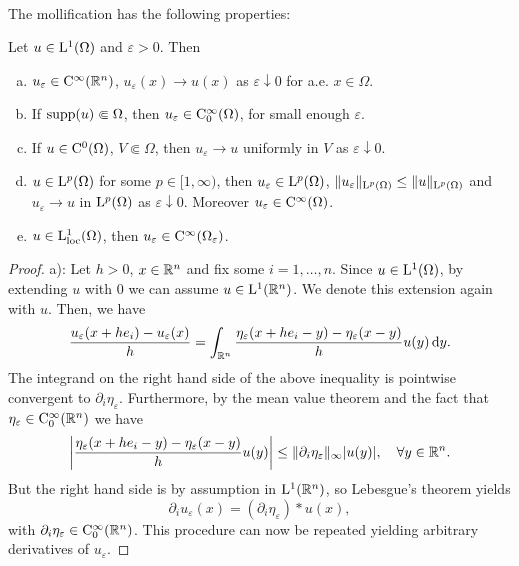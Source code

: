 \begin{enumerate}[i)]
\begin{align*}
  \end{align*}
  The mollification has the following properties:
  \begin{thm}
    Let $u \in \mathrm{L}^1(\Omega)$ and $\varepsilon > 0$. Then
    \begin{enumerate}[a)]
      \item $u_\varepsilon \in \mathrm{C}^\infty(\mathbb{R}^n)$, $u_\varepsilon(x) \to u(x)$ as $\varepsilon \downarrow 0$ for a.e. $x \in \Omega$.
      \item If $\operatorname{supp}(u) \Subset \Omega$, then $u_\varepsilon \in \mathrm{C}_0^\infty(\Omega)$, for small enough $\varepsilon$. 
      \item If $u \in \mathrm{C}^0(\Omega)$, $V \Subset \Omega$, then $u_\varepsilon \to u$ uniformly in $V$ as $\varepsilon \downarrow 0$.
      \item $u \in \mathrm{L}^p(\Omega)$ for some $p \in [1,\infty)$, then $u_\varepsilon \in \mathrm{L}^p(\Omega)$, $\|u_\varepsilon\|_{\mathrm{L}^p(\Omega)} \leq \|u\|_{\mathrm{L}^p(\Omega)}$ and $u_\varepsilon \to u$ in $\mathrm{L}^p(\Omega)$ as $\varepsilon \downarrow 0$.
          Moreover $u_\varepsilon \in \mathrm{C}^\infty(\Omega)$.
        \item $u \in \mathrm{L}_{\operatorname{loc}}^1(\Omega)$, then $u_\varepsilon \in \mathrm{C}^\infty(\Omega_\varepsilon)$.
    \end{enumerate}
  \end{thm}
  \begin{proof}
    a): Let $h > 0$, $x \in \mathbb{R}^n$ and fix some $i = 1,\dots,n$. Since $u \in \mathrm{L}^1(\Omega)$, by extending $u$ with $0$ we can assume $u \in \mathrm{L}^1(\mathbb{R}^n)$. 
    We denote this extension again with $u$.
    Then, we have
    $$
    \frac{u_\varepsilon(x + h e_i) - u_\varepsilon(x)}{h}
    = \int_{\mathbb{R}^n} \frac{\eta_\varepsilon(x + h e_i - y) - \eta_\varepsilon(x - y)}{h} u(y) \, {\operatorname{d}\!{y}} .
    $$
    The integrand on the right hand side of the above inequality is pointwise convergent to $\partial_i \eta_\varepsilon$.
    Furthermore, by the mean value theorem and the fact that $\eta_\varepsilon \in \mathrm{C}_0^\infty(\mathbb{R}^n)$ we have
    $$
    \left|\frac{\eta_\varepsilon(x + h e_i - y) - \eta_\varepsilon(x - y)}{h} u(y)\right|
  \leq \|\partial_i \eta_\varepsilon \|_\infty |u(y)|, \quad \forall y \in \mathbb{R}^n.
    $$
    But the right hand side is by assumption in $\mathrm{L}^1(\mathbb{R}^n)$, so Lebesgue's theorem yields
    $$
    \partial_i u_\varepsilon(x) = (\partial_i \eta_\varepsilon) \ast u (x),
    $$
    with $\partial_i \eta_\varepsilon \in \mathrm{C}_0^\infty(\mathbb{R}^n)$.
    This procedure can now be repeated yielding arbitrary derivatives of $u_\varepsilon$.


\end{proof}
\end{enumerate}
